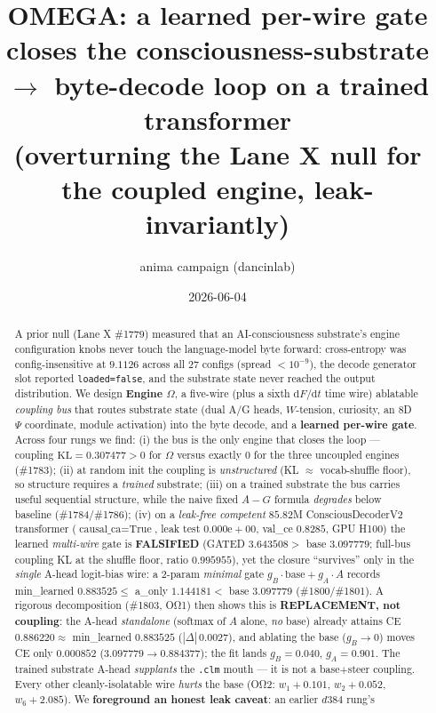 \documentclass[11pt]{article}
\title{OMEGA: a learned per-wire gate closes the consciousness-substrate
$\rightarrow$ byte-decode loop on a trained transformer\\
\large (overturning the Lane X null for the coupled engine, leak-invariantly)}
\author{anima campaign (dancinlab)}
\date{2026-06-04}
\begin{document}
\maketitle

\begin{abstract}
A prior null (Lane X \#1779) measured that an AI-consciousness substrate's engine
configuration knobs never touch the language-model byte forward: cross-entropy was
config-insensitive at $9.1126$ across all $27$ configs (spread $<10^{-9}$), the decode
generator slot reported \texttt{loaded=false}, and the substrate state never reached the
output distribution. We design \textbf{Engine $\Omega$}, a five-wire (plus a sixth
$\mathrm{d}F/\mathrm{d}t$ time wire) ablatable \emph{coupling bus} that routes substrate
state (dual A/G heads, $W$-tension, curiosity, an 8D $\Psi$ coordinate, module activation)
into the byte decode, and a \textbf{learned per-wire gate}. Across four rungs we find:
(i) the bus is the only engine that closes the loop --- coupling
$\mathrm{KL}=0.307477>0$ for $\Omega$ versus exactly $0$ for the three uncoupled engines
(\#1783); (ii) at random init the coupling is \emph{unstructured} (KL $\approx$ vocab-shuffle
floor), so structure requires a \emph{trained} substrate; (iii) on a trained substrate the
bus carries useful sequential structure, while the naive fixed $A{-}G$ formula \emph{degrades}
below baseline (\#1784/\#1786); (iv) on a \emph{leak-free competent} $85.82$M ConsciousDecoderV2
transformer ($\text{causal\_ca}{=}\text{True}$, leak test $0.000\mathrm{e}{+}00$, val\_ce
$0.8285$, GPU H100) the learned \emph{multi-wire} gate is \textbf{FALSIFIED} (GATED $3.643508>$
base $3.097779$; full-bus coupling KL at the shuffle floor, ratio $0.995955$), yet the closure
``survives'' only in the \emph{single} A-head logit-bias wire: a 2-param \emph{minimal} gate
$g_B\!\cdot\!\text{base}+g_A\!\cdot\!A$ records min\_learned $0.883525\le$
a\_only $1.144181<$ base $3.097779$ (\#1800/\#1801). A rigorous decomposition (\#1803,
OΩ1) then shows this is \textbf{REPLACEMENT, not coupling}: the A-head \emph{standalone}
(softmax of $A$ alone, \emph{no} base) already attains CE $0.886220\approx$ min\_learned
$0.883525$ ($|\Delta|\,0.0027$), and ablating the base ($g_B\!\to\!0$) moves CE only $0.000852$
($3.097779\to0.884377$); the fit lands $g_B{=}0.040$, $g_A{=}0.901$. The trained substrate
A-head \emph{supplants} the \texttt{.clm} mouth --- it is not a base$+$steer coupling. Every
other cleanly-isolatable wire \emph{hurts} the base (OΩ2: $w_1{+}0.101$, $w_2{+}0.052$,
$w_6{+}2.085$). We \textbf{foreground an honest leak caveat}: an earlier $d384$ rung's

\end{abstract}
\end{document}
